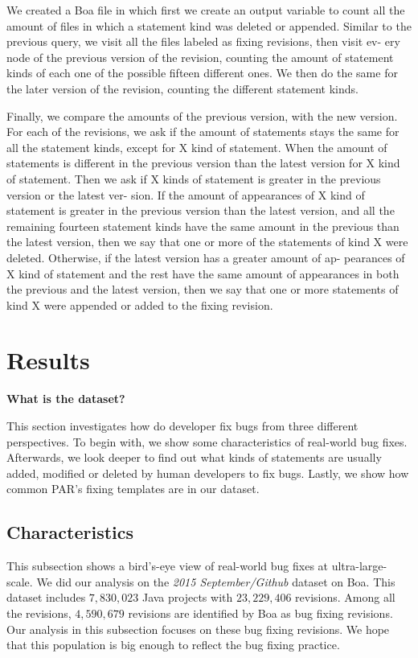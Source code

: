 \documentclass{sig-alternate-05-2015}
\newcommand{\todo}[1]
  {{\scriptsize \textbf{\color{red} {#1}}}}
\begin{document}
We created a Boa file in which first we create an output variable to count all
the amount of files in which a statement kind was deleted or appended. Similar
to the previous query, we visit all the files labeled as fixing revisions, then
visit ev- ery node of the previous version of the revision, counting the amount
of statement kinds of each one of the possible fifteen different ones. We then
do the same for the later version of the revision, counting the different
statement kinds.

Finally, we compare the amounts of the previous version, with the new
version. For each of the revisions, we ask if the amount of statements stays the
same for all the statement kinds, except for X kind of statement. When the
amount of statements is different in the previous version than the latest
version for X kind of statement. Then we ask if X kinds of statement is greater
in the previous version or the latest ver- sion. If the amount of appearances of
X kind of statement is greater in the previous version than the latest version,
and all the remaining fourteen statement kinds have the same amount in the
previous than the latest version, then we say that one or more of the statements
of kind X were deleted. Otherwise, if the latest version has a greater amount of
ap- pearances of X kind of statement and the rest have the same amount of
appearances in both the previous and the latest version, then we say that one or
more statements of kind X were appended or added to the fixing revision.



\section{Results}

\todo{What is the dataset?}

This section investigates how do developer fix bugs from three different
perspectives. To begin with, we show some characteristics of real-world bug
fixes.  Afterwards, we look deeper to find out what kinds of statements are
usually added, modified or deleted by human developers to fix bugs. Lastly, we
show how common PAR's fixing templates are in our dataset. 

\subsection{Characteristics}

This subsection shows a bird's-eye view of real-world bug fixes at
ultra-large-scale. We did our analysis on the \emph{2015 September/Github}
dataset on Boa. This dataset includes $7,830,023$ Java projects with
$23,229,406$ revisions. Among all the revisions, $4,590,679$ revisions are
identified by Boa as bug fixing revisions. Our analysis in this subsection
focuses on these bug fixing revisions. We hope that this population
is big enough to reflect the bug fixing practice.
\end{document}
